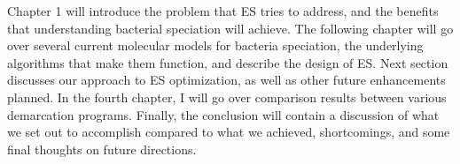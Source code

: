 Chapter 1 will introduce the problem that ES tries to address, and the benefits that understanding bacterial speciation will achieve.
The following chapter will go over several current molecular models for bacteria speciation, the underlying algorithms that make them function, and describe the design of ES.
Next section discusses our approach to ES optimization, as well as other future enhancements planned.
In the fourth chapter, I will go over comparison results between various demarcation programs.
Finally, the conclusion will contain a discussion of what we set out to accomplish compared to what we achieved, shortcomings, and some final thoughts on future directions.

